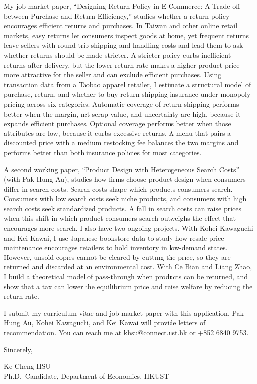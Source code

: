 \documentclass[11pt]{article}
\begin{document}
My job market paper, ``Designing Return Policy in E-Commerce: A Trade-off between Purchase and Return Efficiency,'' studies whether a return policy encourages efficient returns and purchases. In Taiwan and other online retail markets, easy returns let consumers inspect goods at home, yet frequent returns leave sellers with round-trip shipping and handling costs and lead them to ask whether returns should be made stricter. A stricter policy curbs inefficient returns after delivery, but the lower return rate makes a higher product price more attractive for the seller and can exclude efficient purchases. Using transaction data from a Taobao apparel retailer, I estimate a structural model of purchase, return, and whether to buy return-shipping insurance under monopoly pricing across six categories. Automatic coverage of return shipping performs better when the margin, net scrap value, and uncertainty are high, because it expands efficient purchases. Optional coverage performs better when those attributes are low, because it curbs excessive returns. A menu that pairs a discounted price with a medium restocking fee balances the two margins and performs better than both insurance policies for most categories.

A second working paper, ``Product Design with Heterogeneous Search Costs'' (with Pak Hung Au), studies how firms choose product design when consumers differ in search costs. Search costs shape which products consumers search. Consumers with low search costs seek niche products, and consumers with high search costs seek standardized products. A fall in search costs can raise prices when this shift in which product consumers search outweighs the effect that encourages more search. I also have two ongoing projects. With Kohei Kawaguchi and Kei Kawai, I use Japanese bookstore data to study how resale price maintenance encourages retailers to hold inventory in low-demand states. However, unsold copies cannot be cleared by cutting the price, so they are returned and discarded at an environmental cost. With Ce Bian and Liang Zhao, I build a theoretical model of pass-through when products can be returned, and show that a tax can lower the equilibrium price and raise welfare by reducing the return rate.

I submit my curriculum vitae and job market paper with this application. Pak Hung Au, Kohei Kawaguchi, and Kei Kawai will provide letters of recommendation. You can reach me at khsu@connect.ust.hk or +852 6840 9753.

\vspace{0.35em}
Sincerely,

\vspace{0.35em}
Ke Cheng HSU \\
Ph.D.\ Candidate, Department of Economics, HKUST
\end{document}

